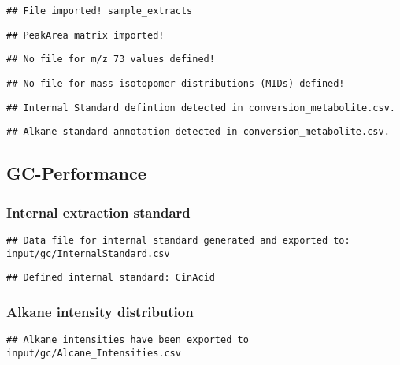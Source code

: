 \documentclass[9pt,]{article}
\begin{document}
\begin{verbatim}
## File imported! sample_extracts
\end{verbatim}

\begin{verbatim}
## PeakArea matrix imported!
\end{verbatim}

\begin{verbatim}
## No file for m/z 73 values defined!
\end{verbatim}

\begin{verbatim}
## No file for mass isotopomer distributions (MIDs) defined!
\end{verbatim}

\begin{verbatim}
## Internal Standard defintion detected in conversion_metabolite.csv.
\end{verbatim}

\begin{verbatim}
## Alkane standard annotation detected in conversion_metabolite.csv.
\end{verbatim}

\subsection{GC-Performance}\label{gc-performance}

\subsubsection{Internal extraction
standard}\label{internal-extraction-standard}

\begin{verbatim}
## Data file for internal standard generated and exported to: input/gc/InternalStandard.csv
\end{verbatim}

\begin{verbatim}
## Defined internal standard: CinAcid
\end{verbatim}

\subsubsection{Alkane intensity
distribution}\label{alkane-intensity-distribution}

\begin{verbatim}
## Alkane intensities have been exported to input/gc/Alcane_Intensities.csv
\end{verbatim}
\end{document}
